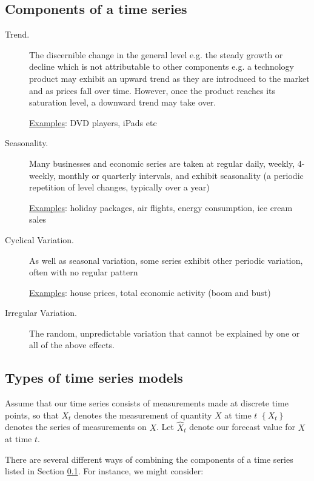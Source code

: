 \documentclass[12pt,a4paper,openany,twoside]{report}
\theoremstyle{definition}
\theoremstyle{remark}
\theoremstyle{plain}
\theoremstyle{definition}
\theoremstyle{definition}
\theoremstyle{definition}
\theoremstyle{remark}
\begin{document}
\hypertarget{tscomponents}{%
\subsection{Components of a time series}\label{tscomponents}}

\begin{description}
\item[Trend.]  The discernible change in the general level e.g. the steady growth
or decline which is not attributable to other components
e.g. a technology product may exhibit an upward trend as they are
introduced to the market and as prices fall over time. However, once
the product reaches its saturation level, a downward trend may take over.

\underline{Examples}: DVD players, iPads etc

\item[Seasonality.]  Many businesses and economic series are taken at regular daily,
weekly, 4-weekly, monthly or quarterly intervals, and exhibit
seasonality (a periodic repetition of level changes, typically over
a year)

\underline{Examples}: holiday packages, air flights, energy consumption, ice
cream sales

\item[Cyclical Variation.]  As well as seasonal variation, some series exhibit other periodic
variation, often with no regular pattern

\underline{Examples}: house prices, total economic activity (boom and bust)

\item[Irregular Variation.]  The random, unpredictable variation that cannot be explained by one or
all of the above effects.
\end{description}

\hypertarget{tstypes}{%
\subsection{Types of time series models}\label{tstypes}}

Assume that our time series consists of measurements made at discrete
time points, so that \(X_{t}\) denotes the measurement of quantity \(X\) at time \(t\)
\(\left\{X_{t} \right\}\) denotes the series of measurements on \(X\).
Let \({\hat{X}}_{t}\) denote our forecast value for \(X\) at time \(t\).

There are several different ways of combining the components of a time
series listed in Section \ref{tscomponents}. For instance, we might consider:
\end{document}
